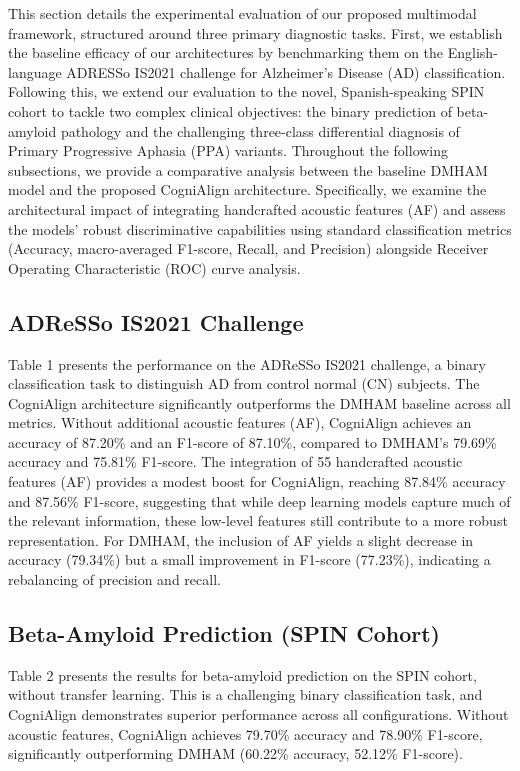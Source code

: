 \documentclass{Odyssey2026}
\begin{document}
This section details the experimental evaluation of our proposed multimodal framework, structured around three primary diagnostic tasks. First, we establish the baseline efficacy of our architectures by benchmarking them on the English-language ADRESSo IS2021 challenge for Alzheimer's Disease (AD) classification. Following this, we extend our evaluation to the novel, Spanish-speaking SPIN cohort to tackle two complex clinical objectives: the binary prediction of beta-amyloid pathology and the challenging three-class differential diagnosis of Primary Progressive Aphasia (PPA) variants. Throughout the following subsections, we provide a comparative analysis between the baseline DMHAM model and the proposed CogniAlign architecture. Specifically, we examine the architectural impact of integrating handcrafted acoustic features (AF) and assess the models' robust discriminative capabilities using standard classification metrics (Accuracy, macro-averaged F1-score, Recall, and Precision) alongside Receiver Operating Characteristic (ROC) curve analysis.

\subsection{ADReSSo IS2021 Challenge}
Table 1 presents the performance on the ADReSSo IS2021 challenge, a binary classification task to distinguish AD from control normal (CN) subjects. The CogniAlign architecture significantly outperforms the DMHAM baseline across all metrics. Without additional acoustic features (AF), CogniAlign achieves an accuracy of 87.20\% and an F1-score of 87.10\%, compared to DMHAM's 79.69\% accuracy and 75.81\% F1-score. The integration of 55 handcrafted acoustic features (AF) provides a modest boost for CogniAlign, reaching 87.84\% accuracy and 87.56\% F1-score, suggesting that while deep learning models capture much of the relevant information, these low-level features still contribute to a more robust representation. For DMHAM, the inclusion of AF yields a slight decrease in accuracy (79.34\%) but a small improvement in F1-score (77.23\%), indicating a rebalancing of precision and recall.


\subsection{Beta-Amyloid Prediction (SPIN Cohort)}
Table 2 presents the results for beta-amyloid prediction on the SPIN cohort, without transfer learning. This is a challenging binary classification task, and CogniAlign demonstrates superior performance across all configurations. Without acoustic features, CogniAlign achieves 79.70\% accuracy and 78.90\% F1-score, significantly outperforming DMHAM (60.22\% accuracy, 52.12\% F1-score).
\end{document}
